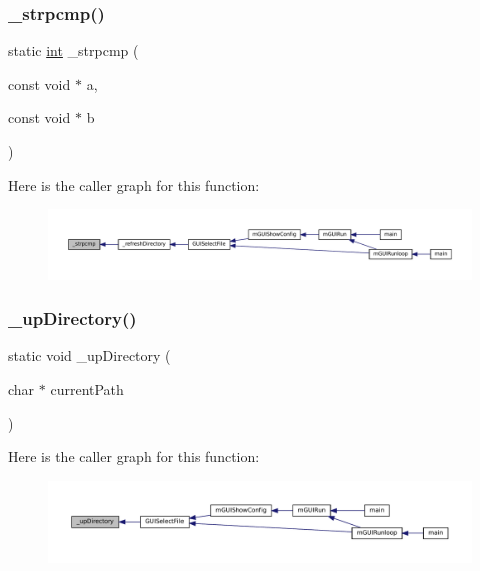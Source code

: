 \subsubsection{\texorpdfstring{\+\_\+strpcmp()}{\_strpcmp()}}
{\footnotesize\ttfamily static \mbox{\hyperlink{ioapi_8h_a787fa3cf048117ba7123753c1e74fcd6}{int}} \+\_\+strpcmp (\begin{DoxyParamCaption}\item[{const void $\ast$}]{a,  }\item[{const void $\ast$}]{b }\end{DoxyParamCaption})\hspace{0.3cm}{\ttfamily [static]}}

Here is the caller graph for this function\+:
\nopagebreak
\begin{figure}[H]
\begin{center}
\leavevmode
\includegraphics[width=350pt]{file-select_8c_aac23dd0c263192be4391a136d2d31d9a_icgraph}
\end{center}
\end{figure}
\mbox{\label{file-select_8c_a52fbed7d72ffed083d8277f5070ad33d}} 
\subsubsection{\texorpdfstring{\+\_\+up\+Directory()}{\_upDirectory()}}
{\footnotesize\ttfamily static void \+\_\+up\+Directory (\begin{DoxyParamCaption}\item[{char $\ast$}]{current\+Path }\end{DoxyParamCaption})\hspace{0.3cm}{\ttfamily [static]}}

Here is the caller graph for this function\+:
\nopagebreak
\begin{figure}[H]
\begin{center}
\leavevmode
\includegraphics[width=350pt]{file-select_8c_a52fbed7d72ffed083d8277f5070ad33d_icgraph}
\end{center}
\end{figure}
\mbox{\label{file-select_8c_a8ad8aec85f35dc0c7d53e825447c3fcb}} 
